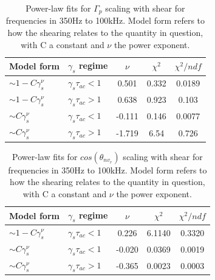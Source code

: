 \documentclass[aip,pop,amsmath,amssymb,reprint,superscriptaddress]{revtex4-1} %
\begin{document}
\begin{table}
\caption{\label{tab:table3}Power-law fits for $\Gamma_{p}$ scaling with shear for frequencies in 350Hz to 100kHz. Model form refers to how the shearing relates to the quantity in question, with C a constant and $\nu$ the power exponent.}
\begin{ruledtabular}
\begin{tabular}{llccc}
Model form&$\gamma_{s}$ regime&$\nu$&$\chi^2$&$\chi^2/ndf$\\
\hline
$\sim 1-C\gamma_{s}^\nu$&$\gamma_{s}\tau_{ac}<1$ &0.501   &0.332    &0.0189\\
$\sim 1-C\gamma_{s}^\nu$&$\gamma_{s}\tau_{ac}>1$ &0.638   &0.923    &0.103\\
$\sim C\gamma_{s}^\nu$&$\gamma_{s}\tau_{ac}<1$   &-0.111  &0.146    &0.0077\\
$\sim C\gamma_{s}^\nu$&$\gamma_{s}\tau_{ac}>1$   &-1.719  &6.54    &0.726\\
\end{tabular}
\end{ruledtabular}
\end{table}

\begin{table}
\caption{\label{tab:table5}Power-law fits for $cos(\theta_{nv_{r}})$ scaling with shear for frequencies in 350Hz to 100kHz. Model form refers to how the shearing relates to the quantity in question, with C a constant and $\nu$ the power exponent.}
\begin{ruledtabular}
\begin{tabular}{llccc}
Model form&$\gamma_{s}$ regime&$\nu$&$\chi^2$&$\chi^2/ndf$\\
\hline
$\sim 1-C\gamma_{s}^\nu$&$\gamma_{s}\tau_{ac}<1$ &0.226   &6.1140    &0.3320\\
$\sim C\gamma_{s}^\nu$&$\gamma_{s}\tau_{ac}<1$   &-0.020  &0.0369    &0.0019\\
$\sim C\gamma_{s}^\nu$&$\gamma_{s}\tau_{ac}>1$   &-0.365  &0.0023    &0.0003\\
\end{tabular}
\end{ruledtabular}
\end{table}
\end{document}
